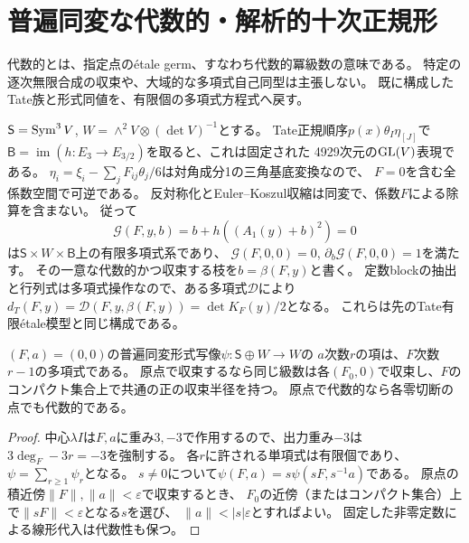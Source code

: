 \section{普遍同変な代数的・解析的十次正規形}
\label{sec:pf-equivariant-algebraization}
代数的とは、指定点の\'{e}tale germ、すなわち代数的冪級数の意味である。
特定の逐次無限合成の収束や、大域的な多項式自己同型は主張しない。
既に構成したTate族と形式同値を、有限個の多項式方程式へ戻す。

$\mathsf S=\operatorname{Sym}^3V$, $W=\wedge^2V\otimes(\det V)^{-1}$とする。
Tate正規順序$p(x)\theta_I\eta_{[J]}$で
$\mathsf B=\operatorname{im}(h:E_3\to E_{3/2})$を取ると、これは固定された
4929次元の$\mathrm{GL}(V)$表現である。
$\eta_i=\xi_i-\sum_jF_{ij}\theta_j/6$は対角成分1の三角基底変換なので、
$F=0$を含む全係数空間で可逆である。
反対称化とEuler--Koszul収縮は同変で、係数$F$による除算を含まない。
従って
\[
 \mathcal G(F,y,b)=b+h((A_1(y)+b)^2)=0
\]
は$\mathsf S\times W\times\mathsf B$上の有限多項式系であり、
$\mathcal G(F,0,0)=0$, $\partial_b\mathcal G(F,0,0)=1$を満たす。
その一意な代数的かつ収束する枝を$b=\beta(F,y)$と書く。
定数blockの抽出と行列式は多項式操作なので、ある多項式$\mathcal D$により
$d_T(F,y)=\mathcal D(F,y,\beta(F,y))=\det K_F(y)/2$となる。
これらは先のTate有限\'{e}tale模型と同じ構成である。

\begin{lemma}[中心重みで零切断全体へ戻す]
\label{lem:pf-center-weight-convergence}
$(F,a)=(0,0)$の普遍同変形式写像$\psi:\mathsf S\oplus W\to W$の
$a$次数$r$の項は、$F$次数$r-1$の多項式である。
原点で収束するなら同じ級数は各$(F_0,0)$で収束し、$F$のコンパクト集合上で共通の正の収束半径を持つ。
原点で代数的なら各零切断の点でも代数的である。
\end{lemma}
\begin{proof}
中心$\lambda I$は$F,a$に重み$3,-3$で作用するので、出力重み$-3$は
$3\deg_F-3r=-3$を強制する。
各$r$に許される単項式は有限個であり、$\psi=\sum_{r\ge1}\psi_r$となる。
$s\ne0$について$\psi(F,a)=s\psi(sF,s^{-1}a)$である。
原点の積近傍$\|F\|,\|a\|<\varepsilon$で収束するとき、
$F_0$の近傍（またはコンパクト集合）上で$\|sF\|<\varepsilon$となる$s$を選び、
$\|a\|<|s|\varepsilon$とすればよい。
固定した非零定数による線形代入は代数性も保つ。
\end{proof}

